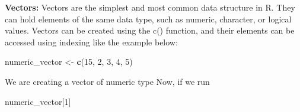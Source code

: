 \documentclass[
]{article}
\newenvironment{Shaded}{\begin{snugshade}}{\end{snugshade}}
\newcommand{\DecValTok}[1]{\textcolor[rgb]{0.00,0.00,0.81}{#1}}
\newcommand{\FunctionTok}[1]{\textcolor[rgb]{0.13,0.29,0.53}{\textbf{#1}}}
\newcommand{\NormalTok}[1]{#1}
\newcommand{\OtherTok}[1]{\textcolor[rgb]{0.56,0.35,0.01}{#1}}
\begin{document}
\textbf{Vectors:} Vectors are the simplest and most common data
structure in R. They can hold elements of the same data type, such as
numeric, character, or logical values. Vectors can be created using the
c() function, and their elements can be accessed using indexing like the
example below:

\begin{Shaded}
\begin{Highlighting}[]
\NormalTok{numeric\_vector }\OtherTok{\textless{}{-}} \FunctionTok{c}\NormalTok{(}\DecValTok{15}\NormalTok{, }\DecValTok{2}\NormalTok{, }\DecValTok{3}\NormalTok{, }\DecValTok{4}\NormalTok{, }\DecValTok{5}\NormalTok{)}
\end{Highlighting}
\end{Shaded}

We are creating a vector of numeric type Now, if we run

\begin{Shaded}
\begin{Highlighting}[]
\NormalTok{numeric\_vector[}\DecValTok{1}\NormalTok{]}
\end{Highlighting}
\end{Shaded}
\end{document}
